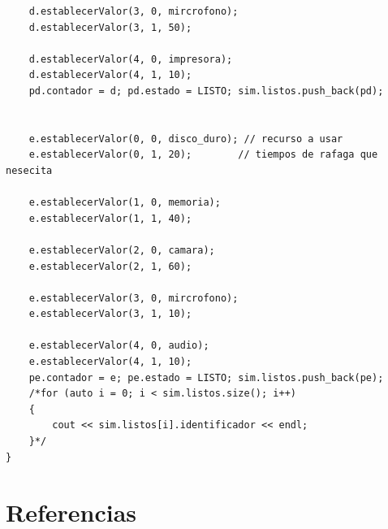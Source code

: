 \documentclass[12pt,a4paper]{article}
\begin{document}
\begin{lstlisting}
    d.establecerValor(3, 0, mircrofono);
    d.establecerValor(3, 1, 50);

    d.establecerValor(4, 0, impresora);
    d.establecerValor(4, 1, 10);
    pd.contador = d; pd.estado = LISTO; sim.listos.push_back(pd);


    e.establecerValor(0, 0, disco_duro); // recurso a usar 
    e.establecerValor(0, 1, 20);        // tiempos de rafaga que nesecita

    e.establecerValor(1, 0, memoria);
    e.establecerValor(1, 1, 40);

    e.establecerValor(2, 0, camara);
    e.establecerValor(2, 1, 60);

    e.establecerValor(3, 0, mircrofono);
    e.establecerValor(3, 1, 10);

    e.establecerValor(4, 0, audio);
    e.establecerValor(4, 1, 10);
    pe.contador = e; pe.estado = LISTO; sim.listos.push_back(pe);
    /*for (auto i = 0; i < sim.listos.size(); i++)
    {
        cout << sim.listos[i].identificador << endl;
    }*/
}
    \end{lstlisting}
\cite{prueba}
\newpage
\section{Referencias}


\end{document}
